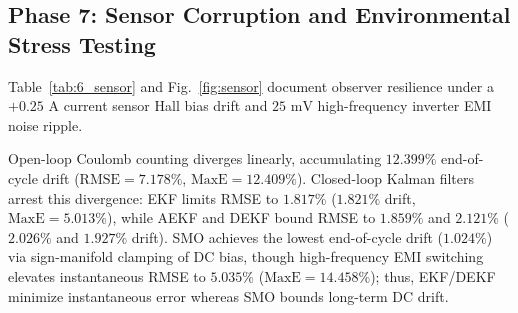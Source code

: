 \documentclass[balance,nocopyright,upint,varvw,hyphenate,barcolor=NavyBlue,nolists]{asmejour}
\begin{document}
\setcounter{table}{6}%
\begin{table}[t]
\caption{Series 8S pack benchmark with cell-to-cell parameter inconsistency [Tier~2 Co-Simulation]\label{tab:7_pack}}
%
\end{table}

\subsection{Phase 7: Sensor Corruption and Environmental Stress Testing}
Table~\ref{tab:6_sensor} and Fig.~\ref{fig:sensor} document observer resilience under a $+0.25\text{ A}$ current sensor Hall bias drift and $25\text{ mV}$ high-frequency inverter EMI noise ripple.

Open-loop Coulomb counting diverges linearly, accumulating $12.399\%$ end-of-cycle drift ($\text{RMSE} = 7.178\%$, $\text{MaxE} = 12.409\%$). Closed-loop Kalman filters arrest this divergence: EKF limits RMSE to $1.817\%$ ($1.821\%$ drift, $\text{MaxE} = 5.013\%$), while AEKF and DEKF bound RMSE to $1.859\%$ and $2.121\%$ ($2.026\%$ and $1.927\%$ drift). SMO achieves the lowest end-of-cycle drift ($1.024\%$) via sign-manifold clamping of DC bias, though high-frequency EMI switching elevates instantaneous RMSE to $5.035\%$ ($\text{MaxE} = 14.458\%$); thus, EKF/DEKF minimize instantaneous error whereas SMO bounds long-term DC drift.

\setcounter{table}{5}%
\begin{table}[t]
\caption{Robustness under Hall current bias ($+0.25\text{ A}$) and inverter EMI ($25\text{ mV}$) [Tier~2 Co-Simulation]\label{tab:6_sensor}}
%
\end{table}
\setcounter{table}{7}%
\end{document}

